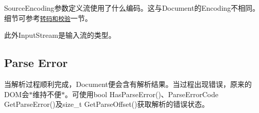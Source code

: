 {\ttfamily Source\+Encoding}参数定义流使用了什么编码。这与{\ttfamily Document}的{\ttfamily Encoding}不相同。细节可参考\href{#TranscodingAndValidation}{\tt 转码和校验}一节。

此外{\ttfamily Input\+Stream}是输入流的类型。\hypertarget{md_Commun_Externe_RapidJSON_doc_dom.zh-cn_ParseError}{}\subsection{Parse Error}\label{md_Commun_Externe_RapidJSON_doc_dom.zh-cn_ParseError}
当解析过程顺利完成，{\ttfamily Document}便会含有解析结果。当过程出现错误，原来的\+D\+O\+M会$\ast$维持不便$\ast$。可使用{\ttfamily bool Has\+Parse\+Error()}、{\ttfamily Parse\+Error\+Code Get\+Parse\+Error()}及{\ttfamily size\+\_\+t Get\+Parse\+Offset()}获取解析的错误状态。

